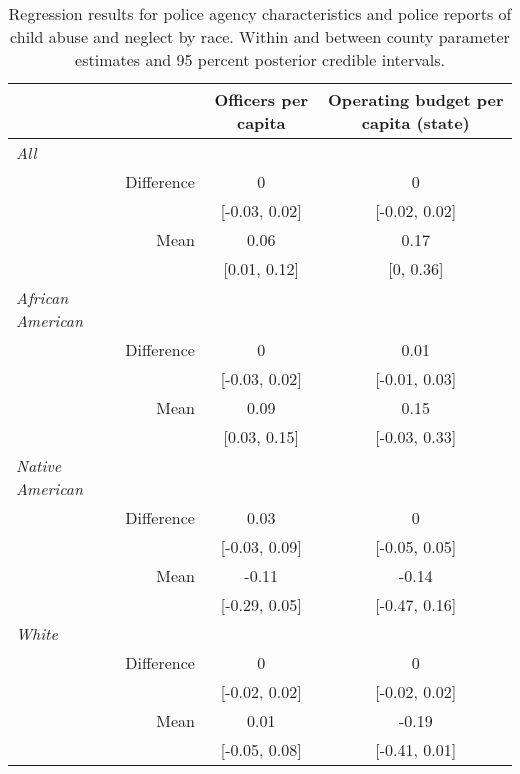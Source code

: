 \begin{table}[ht]
\centering
\caption{Regression results for police agency characteristics and police reports of child abuse and neglect by race. Within and between county parameter estimates and 95 percent posterior credible intervals.} 
\begin{tabular}{lrcc}
  \hline
  &   & Officers per capita & Operating budget per capita (state) \\ 
  \hline
{\textit{All}} &  &  &  \\ 
   & Difference & 0 & 0 \\ 
   &  & [-0.03, 0.02] & [-0.02, 0.02] \\ 
   & Mean & 0.06 & 0.17 \\ 
   &  & [0.01, 0.12] & [0, 0.36] \\ 
  {\textit{African American}} &  &  &  \\ 
   & Difference & 0 & 0.01 \\ 
   &  & [-0.03, 0.02] & [-0.01, 0.03] \\ 
   & Mean & 0.09 & 0.15 \\ 
   &  & [0.03, 0.15] & [-0.03, 0.33] \\ 
  {\textit{Native American}} &  &  &  \\ 
   & Difference & 0.03 & 0 \\ 
   &  & [-0.03, 0.09] & [-0.05, 0.05] \\ 
   & Mean & -0.11 & -0.14 \\ 
   &  & [-0.29, 0.05] & [-0.47, 0.16] \\ 
  {\textit{White}} &  &  &  \\ 
   & Difference & 0 & 0 \\ 
   &  & [-0.02, 0.02] & [-0.02, 0.02] \\ 
   & Mean & 0.01 & -0.19 \\ 
   &  & [-0.05, 0.08] & [-0.41, 0.01] \\ 
   \hline
\end{tabular}
\end{table}
